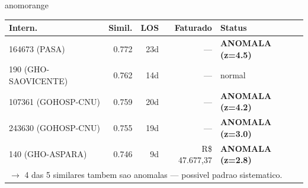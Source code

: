 \documentclass[a4paper,10pt]{article}
\begin{document}
\begin{anomalycard}[Internacao 165070 | GHO-PETROBRAS | ALTO (z=4.56)]{anomorange}
\begin{tabular}{l r r r l}\toprule\textbf{Intern.} & \textbf{Simil.} & \textbf{LOS} & \textbf{Faturado} & \textbf{Status} \\\midrule
164673 (PASA) & 0.772 & 23d & --- & \textcolor{anomred}{\textbf{ANOMALA (z=4.5)}} \\
190 (GHO-SAOVICENTE) & 0.762 & 14d & --- & \textcolor{jcubeblue}{normal} \\
107361 (GOHOSP-CNU) & 0.759 & 20d & --- & \textcolor{anomred}{\textbf{ANOMALA (z=4.2)}} \\
243630 (GOHOSP-CNU) & 0.755 & 19d & --- & \textcolor{anomred}{\textbf{ANOMALA (z=3.0)}} \\
140 (GHO-ASPARA) & 0.746 & 9d & R\$ 47.677,37 & \textcolor{anomred}{\textbf{ANOMALA (z=2.8)}} \\
\multicolumn{5}{l}{\textcolor{anomred}{\small $\rightarrow$ 4 das 5 similares tambem sao anomalas --- possivel padrao sistematico.}} \\
\bottomrule\end{tabular}


\end{anomalycard}

\newpage
\end{document}
